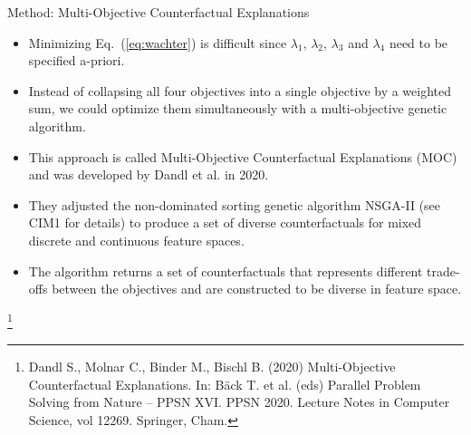 \documentclass[11pt,compress,t,notes=noshow, xcolor=table]{beamer}
\begin{document}
\begin{vbframe}{Method: Multi-Objective Counterfactual Explanations}
	\begin{itemize}
		\item Minimizing Eq.~(\ref{eq:wachter}) is difficult since $\lambda_1$, $\lambda_2$, $\lambda_3$ and $\lambda_4$ need to be specified a-priori. 
		\item Instead of collapsing all four objectives into a single objective by a weighted sum, we could optimize them simultaneously with a multi-objective genetic algorithm. 
		\item This approach is called Multi-Objective Counterfactual Explanations (MOC) and was developed by Dandl et al. in 2020. 
		\item They adjusted the non-dominated sorting genetic algorithm NSGA-II (see CIM1 for details) to produce a set of diverse counterfactuals for mixed discrete and continuous feature spaces.
		\item The algorithm returns a set of counterfactuals that represents different trade-offs between the objectives and are constructed to be diverse in feature space.
	\end{itemize}

	\footnote[frame]{Dandl S., Molnar C., Binder M., Bischl B. (2020) Multi-Objective Counterfactual Explanations. In: Bäck T. et al. (eds) Parallel Problem Solving from Nature – PPSN XVI. PPSN 2020. Lecture Notes in Computer Science, vol 12269. Springer, Cham.}
	
	 
\end{vbframe}
\end{document}
